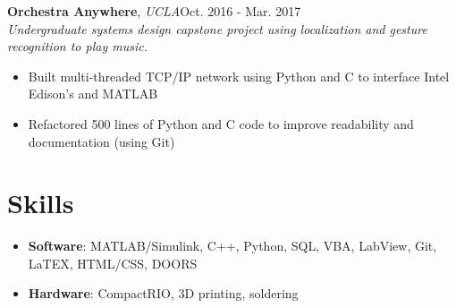 \documentclass[12pt]{article}
\newcommand\firstboxx[2]{\textbf{\fontsize{12.8}{15}\selectfont #1}, \textit{#2}}
\newcommand{\itemheader}[3]{\firstboxx{#1}{#2}\hfill#3}
\begin{document}
\itemheader{Orchestra Anywhere}{UCLA}{Oct. 2016 - Mar. 2017}
\\ \textit{Undergraduate systems design capstone project using localization and gesture recognition to play music.}
\begin{itemize}
\item Built multi-threaded TCP/IP network using Python and C to interface Intel Edison's and MATLAB
\item Refactored 500 lines of Python and C code to improve readability and documentation (using Git)
\end{itemize}

\section*{Skills}
\vspace*{-1em}\makebox[\linewidth]{\rule{\textwidth}{0.4pt}}
\begin{itemize}
\item \textbf{Software}: MATLAB/Simulink, C++, Python, SQL, VBA, LabView, Git, LaTEX, HTML/CSS, DOORS
\item \textbf{Hardware}: CompactRIO, 3D printing, soldering
\end{itemize}
\end{document}
